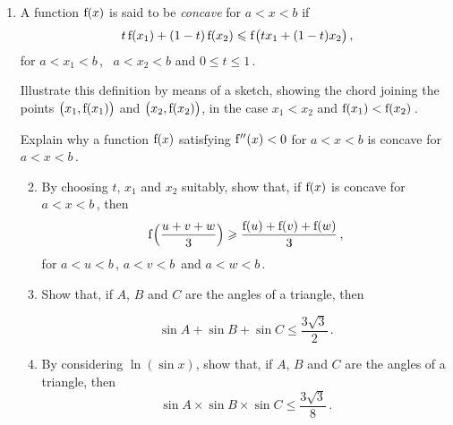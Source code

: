 \documentclass[a4, 11pt]{report}
\newlength{\qspace}
\newcounter{qnumber}
\newenvironment{question}%
 {\vspace{\qspace}
  \begin{enumerate}[\bfseries 1\quad][10]%
    \setcounter{enumi}{\value{qnumber}}%
    \item%
 }
{
  \end{enumerate}
  \filbreak
  \stepcounter{qnumber}
 }
\newenvironment{questionparts}[1][1]%
 {
  \begin{enumerate}[\bfseries (i)]%
    \setcounter{enumii}{#1}
    \addtocounter{enumii}{-1}
    \setlength{\itemsep}{5mm}
    \setlength{\parskip}{5pt}
 }
 {
  \end{enumerate}
 }
\def\f{{\rm f}}
\def\le{\leqslant}
\def\ge{\geqslant}
\begin{document}
\begin{question}
A  function $\f(x)$ is said to be {\em concave} for
  $a<   x <   b$
if
\[
 \ t\,\f(x_1) +(1-t)\,\f(x_2)
\le 
\f\big(tx_1+ (1-t)x_2\big) 
\,
,\]  
 for $a< x_1 < b\,$, \ 
 $a<   x_2<   b$ and $0\le t \le 1\,$.

Illustrate this definition by means of 
a sketch,
 showing the chord joining the points 
$\big(x_1, \f(x_1)\big) $
and
$\big(x_2, \f(x_2)\big) $, in the case $x_1<x_2$ and $\f(x_1)< \f(x_2)\,$.

Explain why a function 
$\f(x)$ 
satisfying  $\f''(x)<0$ for 
$a<   x <   b$  is concave for $a<   x <   b\,$.

\begin{questionparts}
\item
 By choosing $t$, $x_1$ and $x_2$ suitably,
show that, if $\f(x)$ is 
concave for $a<   x <   b\,$, then
\[
\f\Big(\frac{u+ v+w}3\Big) \ge \frac{ \f(u) +\f(v) +\f(w)}3
\,
,\]  
for  $a<   u <   b\,$,  $a<   v <   b\,$ and  $a<   w <   b\,$.
  



\item
Show that, 
if $A$, $B$ and $C$ are the  angles of a triangle, then

\[
\sin A +\sin B + \sin C \le \frac{3\sqrt3}2
\,.
\]
\item
By considering $\ln (\sin x)$, show that,
if $A$, $B$ and $C$ are the  angles of a triangle, then
\[
\sin A \times \sin B \times \sin C \le \frac {3 \sqrt 3}  8 \,.
\]


\end{questionparts}
\end{question}
\end{document}
